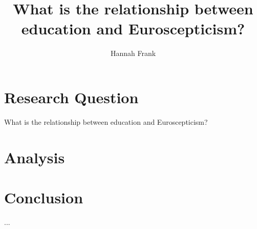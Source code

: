 \documentclass[12pt,a4paper]{article}
\author{Hannah Frank}
\title{What is the relationship between education and Euroscepticism?}
\begin{document}

\maketitle %
	
\section{Research Question} %
What is the relationship between education and Euroscepticism?


\section{Analysis}



\section{Conclusion}
...
\end{document}
